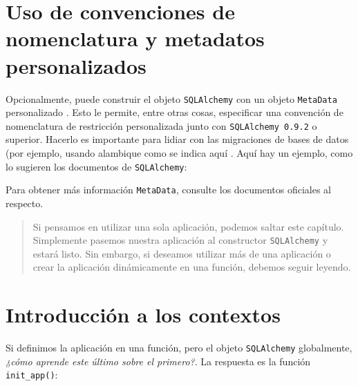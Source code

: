 \documentclass[10pt,letterpaper,notumble]{leaflet}
\begin{document}
{{\begin{minipage}{1.6\linewidth}
        \section{Uso de convenciones de nomenclatura y metadatos personalizados}
        
        Opcionalmente, puede construir el objeto \texttt{SQLAlchemy} con un objeto \texttt{MetaData} personalizado . Esto le permite, entre otras cosas, especificar una convención de nomenclatura de restricción personalizada junto con \texttt{SQLAlchemy 0.9.2} o superior. Hacerlo es importante para lidiar con las migraciones de bases de datos (por ejemplo, usando alambique como se indica aquí . Aquí hay un ejemplo, como lo sugieren los documentos de \texttt{SQLAlchemy}:
        
        
        
        Para obtener más información \texttt{MetaData}, consulte los documentos oficiales al respecto.
    
    \end{minipage}

    }}
    
    \clearpage %
    
    \mbox{}
    
    \clearpage %
    
    \maketitle
    \begin{abstract}
    	Si pensamos en utilizar una sola aplicación, podemos saltar este capítulo. Simplemente pasemos nuestra aplicación al constructor \texttt{SQLAlchemy} y estará listo. Sin embargo, si deseamos utilizar más de una aplicación o crear la aplicación dinámicamente en una función, debemos seguir leyendo.
    \end{abstract}

    \section{Introducción a los contextos}
    
    Si definimos la aplicación en una función, pero el objeto \texttt{SQLAlchemy} globalmente, \textit{¿cómo aprende este último sobre el primero?}. La respuesta es la función \texttt{init\_app()}:
    
\end{document}

